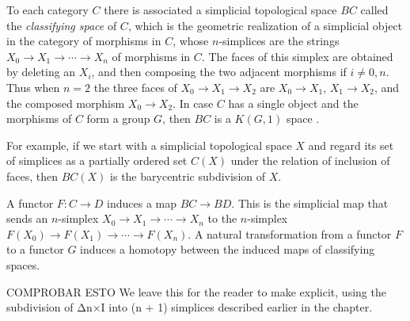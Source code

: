 \documentclass[TFM.tex]{subfiles}
\begin{document}
\begin{ex}
To each category $C$ there is associated a simplicial topological space $BC$ called the \emph{classifying
space} of $C$, which is the geometric realization of a simplicial object in the category of morphisms in $C$, whose $n$-simplices are the strings $X_0→X_1→\cdots →X_n$ of morphisms
in $C$. The faces of this simplex are obtained by deleting an $X_i$, and then composing
the two adjacent morphisms if $i ≠ 0,n$. Thus when $n = 2$ the three faces of
$X_0→X_1→X_2$ are $X_0→X_1$, $X_1→X_2$, and the composed morphism $X_0→X_2$. In
case $C$ has a single object and the morphisms of $C$ form a group $G$, then $BC$ is a $K(G, 1)$ space \cite{Hatcher}.

For example, if we start with a
simplicial topological space $X$ and regard its set of simplices as a partially ordered set $C(X)$ under
the relation of inclusion of faces, then $BC(X)$ is the barycentric subdivision of $X$.

A functor $F :C→D$ induces a map $BC→BD$. This is the simplicial map that sends an
$n$-simplex $X_0→X_1→\cdots →X_n$ to the $n$-simplex $F(X_0)→F(X_1)→\cdots →F(X_n)$.
A natural transformation from a functor $F$ to a functor $G$ induces a homotopy
between the induced maps of classifying spaces. 

COMPROBAR ESTO We leave this for the reader to
make explicit, using the subdivision of Δn×I into (n + 1) simplices described
earlier in the chapter.
\end{ex}
\end{document}
